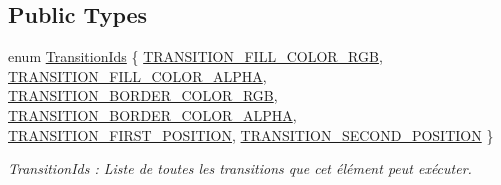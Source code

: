 \subsection*{Public Types}
\begin{DoxyCompactItemize}
\item 
enum \hyperlink{classns_shape_1_1_rectangle_a7c29d64ac1e4ed57a3d70b5616813247}{Transition\+Ids} \{ \newline
\hyperlink{classns_shape_1_1_rectangle_a7c29d64ac1e4ed57a3d70b5616813247a7711b3fc0ebda426d84aba567ef90797}{T\+R\+A\+N\+S\+I\+T\+I\+O\+N\+\_\+\+F\+I\+L\+L\+\_\+\+C\+O\+L\+O\+R\+\_\+\+R\+GB}, 
\hyperlink{classns_shape_1_1_rectangle_a7c29d64ac1e4ed57a3d70b5616813247a3162d563f05248a8a8e9f0ffed332ef0}{T\+R\+A\+N\+S\+I\+T\+I\+O\+N\+\_\+\+F\+I\+L\+L\+\_\+\+C\+O\+L\+O\+R\+\_\+\+A\+L\+P\+HA}, 
\hyperlink{classns_shape_1_1_rectangle_a7c29d64ac1e4ed57a3d70b5616813247a8ba797ba7b99e6952ab754191bf4e553}{T\+R\+A\+N\+S\+I\+T\+I\+O\+N\+\_\+\+B\+O\+R\+D\+E\+R\+\_\+\+C\+O\+L\+O\+R\+\_\+\+R\+GB}, 
\hyperlink{classns_shape_1_1_rectangle_a7c29d64ac1e4ed57a3d70b5616813247ad44045321ec0fd066d54f5a8f41fd947}{T\+R\+A\+N\+S\+I\+T\+I\+O\+N\+\_\+\+B\+O\+R\+D\+E\+R\+\_\+\+C\+O\+L\+O\+R\+\_\+\+A\+L\+P\+HA}, 
\newline
\hyperlink{classns_shape_1_1_rectangle_a7c29d64ac1e4ed57a3d70b5616813247a59d3d78acfe501ec8bed5b31ac8f4230}{T\+R\+A\+N\+S\+I\+T\+I\+O\+N\+\_\+\+F\+I\+R\+S\+T\+\_\+\+P\+O\+S\+I\+T\+I\+ON}, 
\hyperlink{classns_shape_1_1_rectangle_a7c29d64ac1e4ed57a3d70b5616813247a039bcc9b4d76cdb9e15debda929f41ef}{T\+R\+A\+N\+S\+I\+T\+I\+O\+N\+\_\+\+S\+E\+C\+O\+N\+D\+\_\+\+P\+O\+S\+I\+T\+I\+ON}
 \}\begin{DoxyCompactList}\small\item\em Transition\+Ids \+: Liste de toutes les transitions que cet élément peut exécuter. \end{DoxyCompactList}
\end{DoxyCompactItemize}
